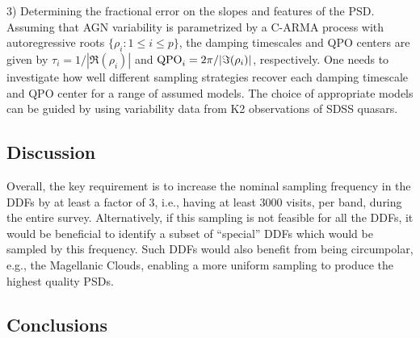 3) Determining the fractional error on the slopes and features of the PSD.
Assuming that AGN variability is parametrized by a C-ARMA process with
autoregressive roots $\{\rho_{i}:1 \leq i \leq p\}$, the damping timescales and
QPO centers are given by $\tau_{i} = 1/|\Re(\rho_{i})|$ and ${\rm QPO}_{i} =
2\pi/|\Im(\rho_{i})|$, respectively. One needs to investigate how well different
sampling strategies recover each damping timescale and QPO center for a range of
assumed models. The choice of appropriate models can be guided by using
variability data from K2 observations of SDSS quasars.

%
%
%
%

\subsection{Discussion}
\label{sec:\secname:discussion}


Overall, the key requirement is to increase the nominal sampling
frequency in the DDFs by at least a factor of 3, i.e., having at least
3000 visits, per band, during the entire survey. Alternatively, if this
sampling is not feasible for all the DDFs, it would be beneficial to
identify a subset of ``special'' DDFs which would be sampled by this
frequency. Such DDFs would also benefit from being circumpolar, e.g.,
the Magellanic Clouds, enabling a more uniform sampling to produce the
highest quality PSDs.

%
\subsection{Conclusions}

